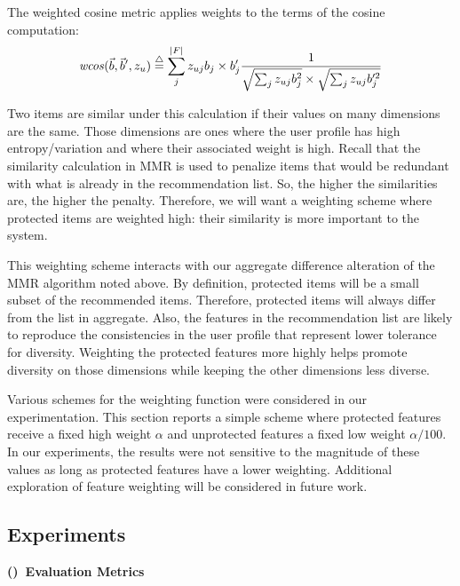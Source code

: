 The weighted cosine metric applies weights to the terms of the cosine computation:
\begin{equation}
    \mathit{wcos}(\vec{b}, \vec{b}', z_u)\buildrel\triangle\over= \sum_{j}^{|F|}{z_{uj} b_j \times b'_j} \frac{1} {\sqrt{\sum_{j} {z_{uj} b^2_j}} \times \sqrt{\sum_{j}{z_{uj} 
    b'^2_j}}}
\end{equation}
\vspace{0.25cm}

Two items are similar under this calculation if their values on many dimensions are the same. Those dimensions are ones where the user profile has high entropy/variation and where their associated weight is high. Recall that the similarity calculation in MMR is used to penalize items that would be redundant with what is already in the recommendation list. So, the higher the similarities are, the higher the penalty. Therefore, we will want a weighting scheme where protected items are weighted high: their similarity is more important to the system.

This weighting scheme interacts with our aggregate difference alteration of the MMR algorithm noted above. By definition, protected items will be a small subset of the recommended items. Therefore, protected items will always differ from the list in aggregate. Also, the features in the recommendation list are likely to reproduce the consistencies in the user profile that represent lower tolerance for diversity. Weighting the protected features more highly helps promote diversity on those dimensions while keeping the other dimensions less diverse.

Various schemes for the weighting function were considered in our experimentation. This section reports a simple scheme where protected features receive a fixed high weight $\alpha$ and unprotected features a fixed low weight $\alpha/100$. In our experiments, the results were not sensitive to the magnitude of these values as long as protected features have a lower weighting. Additional exploration of feature weighting will be considered in future work. 


\subsection{Experiments}\label{subsect:ofair_expp}
\label{subsec:ofair_experiemtns}

\vspace{0.25cm}
\noindent \textbf{()~Evaluation Metrics}
\vspace{0.25cm}

